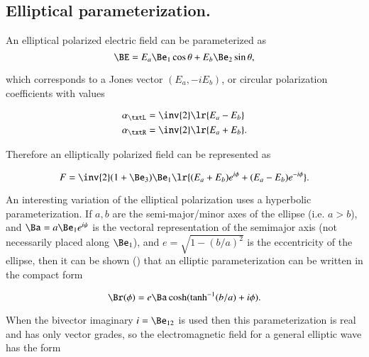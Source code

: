 
\subsection{Elliptical parameterization.}

An elliptical polarized electric field can be parameterized as
\begin{dmath}\label{eqn:ellipticalWaves:340}
\BE
=
E_a \Be_1 \cos\theta + E_b \Be_2 \sin\theta,
\end{dmath}

which corresponds to a Jones vector \( (E_a, -i E_b) \), or circular polarization coefficients with values

\begin{dmath}\label{eqn:polarization:400}
\begin{aligned}
\alpha_\txtL &= \inv{2}\lr{ E_a - E_b } \\
\alpha_\txtR &= \inv{2}\lr{ E_a + E_b }.
\end{aligned}
\end{dmath}

Therefore an elliptically polarized field can be represented as

\begin{dmath}\label{eqn:polarization:420}
F = \inv{2} (1 + \Be_3) \Be_1 \lr{ (E_a + E_b) e^{i\phi} + (E_a - E_b) e^{-i\phi} }.
\end{dmath}

An interesting variation of the elliptical polarization uses a hyperbolic parameterization.
If \( a, b \) are the semi-major/minor axes of the ellipse (i.e. \( a > b \)),
and \( \Ba = a \Be_1 e^{i\psi} \) is the vectoral representation of the semimajor axis (not necessarily placed along \( \Be_1 \)),
and \( e = \sqrt{1 - (b/a)^2} \) is the eccentricity of the ellipse,
then it can be shown (\citep{hestenes1999nfc})
that an elliptic parameterization can be written
in the compact form

\begin{dmath}\label{eqn:ellipticalWaves:360}
\Br(\phi)
=
e \Ba \cosh( \tanh^{-1}(b/a) + i \phi).
\end{dmath}

When the bivector imaginary \( i = \Be_{12} \) is used then
this parameterization is real and has only vector grades, so the electromagnetic field for a general elliptic wave has the form


